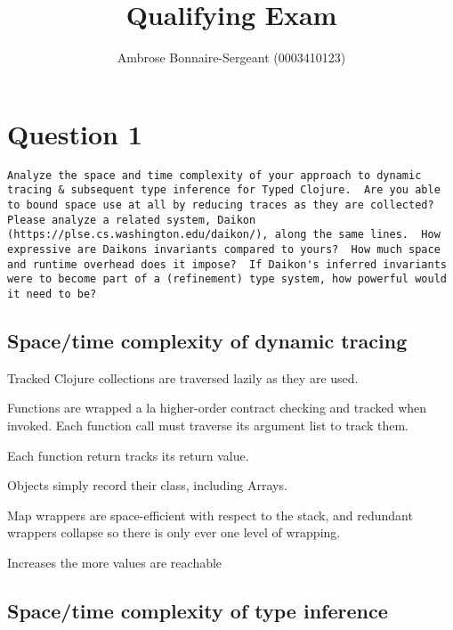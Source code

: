 \documentclass[10pt]{article}
\begin{document}
\title{Qualifying Exam}
\author{Ambrose Bonnaire-Sergeant (0003410123)}

\maketitle


\section*{Question 1}

\begin{verbatim}
Analyze the space and time complexity of your approach to dynamic
tracing & subsequent type inference for Typed Clojure.  Are you able
to bound space use at all by reducing traces as they are collected?
Please analyze a related system, Daikon
(https://plse.cs.washington.edu/daikon/), along the same lines.  How
expressive are Daikons invariants compared to yours?  How much space
and runtime overhead does it impose?  If Daikon's inferred invariants
were to become part of a (refinement) type system, how powerful would
it need to be?
\end{verbatim}

\subsection*{Space/time complexity of dynamic tracing}

Tracked Clojure collections are traversed lazily as they are used.

Functions are wrapped a la higher-order contract checking and
tracked when invoked.
Each function call must traverse its argument list to track them.

Each function return tracks its return value.

Objects simply record their class, including Arrays.

Map wrappers are space-efficient with respect to the stack, and
redundant wrappers collapse so there is only ever one level of
wrapping.

Increases the more values are reachable 

\subsection*{Space/time complexity of type inference}
\end{document}
